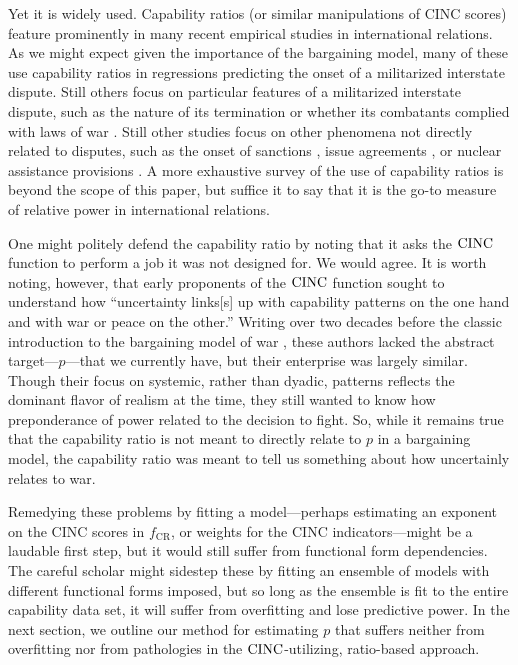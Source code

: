 Yet it is widely used. Capability ratios (or similar manipulations of CINC scores) feature prominently in many recent empirical studies in international relations. 
As we might expect given the importance of the bargaining model, many of these \citep[e.g.][]{gartzke2007,salehyan2008} use capability ratios in regressions predicting the onset of a militarized interstate dispute. 
Still others focus on particular features of a militarized interstate dispute, such as the nature of its termination \citep[e.g.][]{beardsley2008} or whether its combatants complied with laws of war \citep[e.g.][]{morrow2007}. 
Still other studies focus on other phenomena not directly related to disputes, such as the onset of sanctions \citep[e.g.][]{whang2013}, issue agreements \citep[e.g.][]{mitchell2007}, or nuclear assistance provisions \citep[e.g.][]{kroenig2009}. 
A more exhaustive survey of the use of capability ratios is beyond the scope of this paper, but suffice it to say that it is the go-to measure of relative power in international relations.

One might politely defend the capability ratio by noting that it asks the $\operatorname{CINC}$ function to perform a job it was not designed for. 
We would agree. 
It is worth noting, however, that early proponents of the $\operatorname{CINC}$ function \citep[24]{singer1972} sought to understand how ``uncertainty links[s] up with capability patterns on the one hand and with war or peace on the other.'' 
Writing over two decades before the classic introduction to the bargaining model of war \citep{fearon1995}, these authors lacked the abstract target---$p$---that we currently have, but their enterprise was largely similar. 
Though their focus on systemic, rather than dyadic, patterns reflects the dominant flavor of realism at the time, they still wanted to know how preponderance of power related to the decision to fight. 
So, while it remains true that the capability ratio is not meant to directly relate to $p$ in a bargaining model, the capability ratio was meant to tell us something about how uncertainly relates to war.

Remedying these problems by fitting a model---perhaps estimating an exponent on the CINC scores in $f_{\text{CR}}$, or weights for the CINC indicators---might be a laudable first step, but it would still suffer from functional form dependencies. 
The careful scholar might sidestep these by fitting an ensemble of models with different functional forms imposed, but so long as the ensemble is fit to the entire capability data set, it will suffer from overfitting and lose predictive power. 
In the next section, we outline our method for estimating $p$ that suffers neither from overfitting nor from pathologies in the $\operatorname{CINC}$-utilizing, ratio-based approach. 
